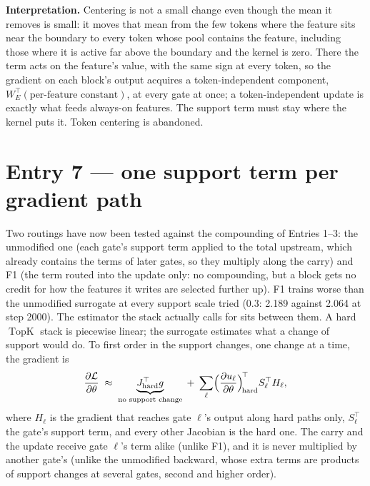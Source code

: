 \documentclass[11pt,a4paper]{article}
\newcommand{\topk}{\operatorname{TopK}}
\begin{document}
\textbf{Interpretation.}  Centering is not a small change even though the mean it removes is small: it moves that
mean from the few tokens where the feature sits near the boundary to every token whose pool contains the feature,
including those where it is active far above the boundary and the kernel is zero.  There the term acts on the
feature's value, with the same sign at every token, so the gradient on each block's output acquires a
token-independent component, \(W_E^\top(\text{per-feature constant})\), at every gate at once; a token-independent
update is exactly what feeds always-on features.  The support term must stay where the kernel puts it.
Token centering is abandoned.

\section{Entry 7 --- one support term per gradient path}

Two routings have now been tested against the compounding of Entries 1--3: the unmodified one (each gate's support
term applied to the total upstream, which already contains the terms of later gates, so they multiply along the
carry) and F1 (the term routed into the update only: no compounding, but a block gets no credit for how the
features it writes are selected further up).  F1 trains worse than the unmodified surrogate at every support scale
tried (0.3: 2.189 against 2.064 at step 2000).  The estimator the stack actually calls for sits between them.  A
hard \(\topk\) stack is piecewise linear; the surrogate estimates what a change of support would do.  To first
order in the support changes, one change at a time, the gradient is
\begin{equation}
  \frac{\partial\mathcal L}{\partial\theta}\;\approx\;\underbrace{J_{\rm hard}^\top g}_{\text{no support change}}
  \;+\;\sum_\ell \Bigl(\frac{\partial u_\ell}{\partial\theta}\Bigr)^{\!\top}_{\!\rm hard} S_\ell^\top H_\ell ,
\end{equation}
where \(H_\ell\) is the gradient that reaches gate \(\ell\)'s output along hard paths only, \(S_\ell^\top\) the gate's
support term, and every other Jacobian is the hard one.  The carry and the update receive gate \(\ell\)'s term alike
(unlike F1), and it is never multiplied by another gate's (unlike the unmodified backward, whose extra terms are
products of support changes at several gates, second and higher order).
\end{document}
